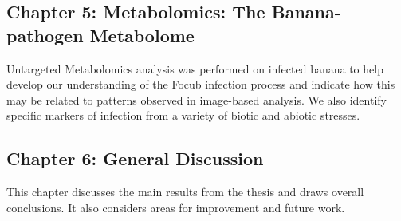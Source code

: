 \subsection{Chapter 5: Metabolomics: The Banana-pathogen Metabolome}
Untargeted Metabolomics analysis was performed on infected banana to help develop our understanding of the \acl{Focub} infection process and indicate how this may be related to patterns observed in image-based analysis. We also identify specific markers of infection from a variety of biotic and abiotic stresses. 

\subsection{Chapter 6: General Discussion}
This chapter discusses the main results from the thesis and draws overall conclusions. It also considers areas for improvement and future work. 


 

 



 



 



 